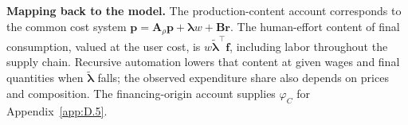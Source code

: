 \documentclass[12pt]{article}
\theoremstyle{plain}
\theoremstyle{definition}
\theoremstyle{remark}
\begin{document}
\textbf{Mapping back to the model.} The production-content account
corresponds to the common cost system
$\mathbf{p}=\mathbf{A}_\rho\mathbf{p}+\bm{\lambda}w+\mathbf{B}\mathbf{r}$.
The human-effort content of final consumption, valued at the user cost, is
$w\widetilde{\bm{\lambda}}^{\top}\mathbf{f}$, including labor
throughout the supply chain. Recursive automation lowers that content at
given wages and final quantities when $\widetilde{\bm{\lambda}}$ falls; the
observed expenditure share also depends on prices and composition. The
financing-origin account supplies $\varphi_C$ for Appendix~\ref{app:D.5}.

\end{document}
